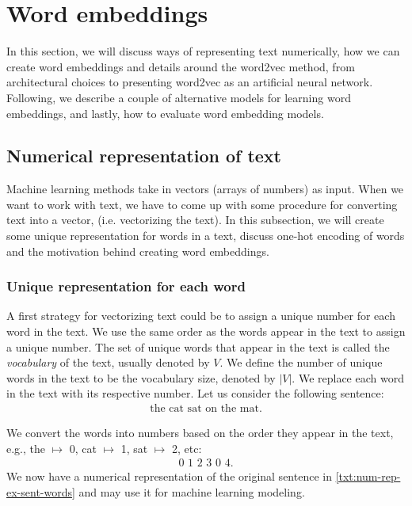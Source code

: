 \section{Word embeddings}
\label{sec:word-embeddings}
In this section, we will discuss ways of representing text numerically, how we can create word embeddings and details around the word2vec method, from architectural choices to presenting word2vec as an artificial neural network. Following, we describe a couple of alternative models for learning word embeddings, and lastly, how to evaluate word embedding models.

\subsection{Numerical representation of text}
Machine learning methods take in vectors (arrays of numbers) as input. When we want to work with text, we have to come up with some procedure for converting text into a vector, (i.e. vectorizing the text).
In this subsection, we will create some unique representation for words in a text, discuss one-hot encoding of words and the motivation behind creating word embeddings.

\subsubsection{Unique representation for each word}
\label{unique-representation-for-each-word}
A first strategy for vectorizing text could be to assign a unique number for each word in the text. We use the same order as the words appear in the text to assign a unique number. The set of unique words that appear in the text is called the \textit{vocabulary} of the text, usually denoted by $V$. We define the number of unique words in the text to be the vocabulary size, denoted by $|V|$. We replace each word in the text with its respective number. Let us consider the following sentence:
\begin{align}
    \text{the cat sat on the mat}.
    \label{txt:num-rep-ex-sent-words}
\end{align}

We convert the words into numbers based on the order they appear in the text, e.g., the $\mapsto$ 0, cat $\mapsto$ 1, sat $\mapsto$ 2, etc:
\begin{align}
    \text{0 1 2 3 0 4} \label{txt:num-rep-ex-sent}.
\end{align}
We now have a numerical representation of the original sentence in \cref{txt:num-rep-ex-sent-words} and may use it for machine learning modeling.

